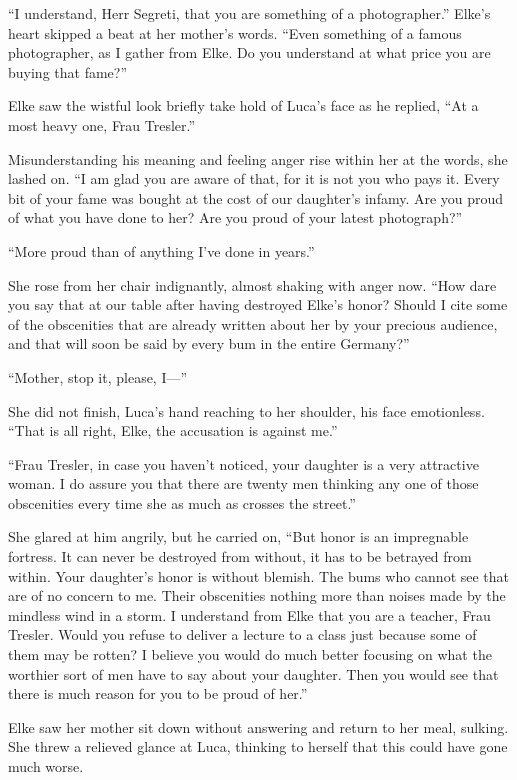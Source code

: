 ``I understand, Herr Segreti, that you are something of a photographer.'' Elke's heart skipped a beat at her mother's words. ``Even something of a famous photographer, as I gather from Elke. Do you understand at what price you are buying that fame?''

Elke saw the wistful look briefly take hold of Luca's face as he replied, ``At a most heavy one, Frau Tresler.''

Misunderstanding his meaning and feeling anger rise within her at the words, she lashed on. ``I am glad you are aware of that, for it is not you who pays it. Every bit of your fame was bought at the cost of our daughter's infamy. Are you proud of what you have done to her? Are you proud of your latest photograph?''

``More proud than of anything I've done in years.''

She rose from her chair indignantly, almost shaking with anger now. ``How dare you say that at our table after having destroyed Elke's honor? Should I cite some of the obscenities that are already written about her by your precious audience, and that will soon be said by every bum in the entire Germany?''

``Mother, stop it, please, I---''

She did not finish, Luca's hand reaching to her shoulder, his face emotionless. ``That is all right, Elke, the accusation is against me.''

``Frau Tresler, in case you haven't noticed, your daughter is a very attractive woman. I do assure you that there are twenty men thinking any one of those obscenities every time she as much as crosses the street.''

She glared at him angrily, but he carried on, ``But honor is an impregnable fortress. It can never be destroyed from without, it has to be betrayed from within. Your daughter's honor is without blemish. The bums who cannot see that are of no concern to me. Their obscenities nothing more than noises made by the mindless wind in a storm. I understand from Elke that you are a teacher, Frau Tresler. Would you refuse to deliver a lecture to a class just because some of them may be rotten? I believe you would do much better focusing on what the worthier sort of men have to say about your daughter. Then you would see that there is much reason for you to be proud of her.''

Elke saw her mother sit down without answering and return to her meal, sulking. She threw a relieved glance at Luca, thinking to herself that this could have gone much worse.

